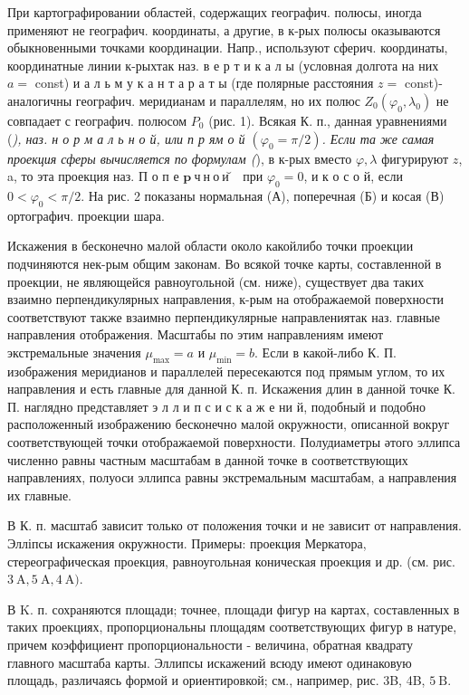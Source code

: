 \documentclass[10pt]{article}
\begin{document}
При картографировании областей, содержащих географич. полюсы, иногда применяют не географич. координаты, а другие, в к-рых полюсы оказываются обыкновенными точками координации. Напр., используют сферич. координаты, координатные линии к-рыхтак наз. в е р т и к а л ы (условная долгота на них $a=$ const) и а л ь м у к а н т а р а т ы (где полярные расстояния $z=$ const)-аналогичны географич. меридианам и параллелям, но их полюс $Z_{0}\left(\varphi_{0}, \lambda_{0}\right)$ не совпадает с географич. полюсом $P_{0}$ (рис. 1). Всякая К. п., данная уравнениями (\textit{), наз. н о р м а л ь н о й, или п р ям о й $\left(\varphi_{0}=\pi / 2\right)$. Если та же самая проекция сферы вычисляется по формулам (}), в к-рых вместо $\varphi, \lambda$ фигурируют $z$, a, то эта проекция наз. П о п е $\mathbf{p} \mathbf{~ ч ~ н ~ о ~ и ̆ ~}$ при $\varphi_{0}=0$, и к о с о й, если $0<\varphi_{0}<\pi / 2$. На рис. 2 показаны нормальная (А), поперечная (Б) и косая (В) ортографич. проекции шара.



Искажения в бесконечно малой области около какойлибо точки проекции подчиняются нек-рым общим законам. Во всякой точке карты, составленной в проекции, не являющейся равноугольной (см. ниже), существует два таких взаимно перпендикулярных направления, к-рым на отображаемой поверхности соответствуют также взаимно перпендикулярные направлениятак наз. главные направления отображения. Масштабы по этим направлениям имеют экстремальные значения $\mu_{\max }=a$ и $\mu_{\min }=b$. Если в какой-либо К. П. изображения меридианов и параллелей пересекаются под прямым углом, то их направления и есть главные для данной К. п. Искажения длин в данной точке К. П. наглядно представляет э л л и п с и с к а ж е ни й, подобный и подобно расположенный изображению бесконечно малой окружности, описанной вокруг соответствующей точки отображаемой поверхности. Полудиаметры әтого эллипса численно равны частным масштабам в данной точке в соответствующих направлениях, полуоси эллипса равны экстремальным масштабам, а направления их главные.



В К. п. масштаб зависит только от положения точки и не зависит от направления. Элліпсы искажения окружности. Примеры: проекция Меркатора, стереографическая проекция, равноугольная коническая проекция и др. (см. рис. $3 \mathrm{~A}, 5 \mathrm{~A}, 4 \mathrm{~A})$.



В K. п. сохраняются площади; точнее, площади фигур на картах, составленных в таких проекциях, пропорциональны площадям соответствующих фигур в натуре, причем коэффициент пропорциональности - величина, обратная квадрату главного масштаба карты. Эллипсы искажений всюду имеют одинаковую площадь, различаясь формой и ориентировкой; см., например, рис. 3B, 4B, $5 \mathrm{~B}$.
\end{document}
